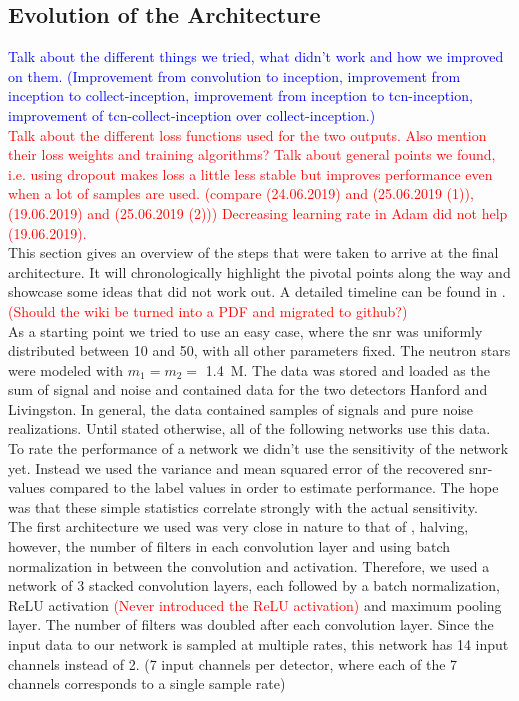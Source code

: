 \subsection{Evolution of the Architecture}\label{sec:evolution_of_architecture}
\textcolor{blue}{Talk about the different things we tried, what didn't work and how we improved on them. (Improvement from convolution to inception, improvement from inception to collect-inception, improvement from inception to tcn-inception, improvement of tcn-collect-inception over collect-inception.)}\\
\textcolor{red}{Talk about the different loss functions used for the two outputs. Also mention their loss weights and training algorithms? Talk about general points we found, i.e. using dropout makes loss a little less stable but improves performance even when a lot of samples are used. (compare (24.06.2019) and (25.06.2019 (1)), (19.06.2019) and (25.06.2019 (2))) Decreasing learning rate in Adam did not help (19.06.2019).}\\
This section gives an overview of the steps that were taken to arrive at the final architecture. It will chronologically highlight the pivotal points along the way and showcase some ideas that did not work out. A detailed timeline can be found in \cite{network_wiki}. \textcolor{red}{(Should the wiki be turned into a PDF and migrated to github?)}\\
As a starting point we tried to use an easy case, where the \gls{snr} was uniformly distributed between 10 and 50, with all other parameters fixed. The neutron stars were modeled with $m_1=m_2=$ \SI{1.4}{M_\odot}. The data was stored and loaded as the sum of signal and noise and contained data for the two detectors Hanford and Livingston. In general, the data contained samples of signals and pure noise realizations. Until stated otherwise, all of the following networks use this data.\\
To rate the performance of a network we didn't use the sensitivity of the network yet. Instead we used the variance and mean squared error of the recovered \gls{snr}-values compared to the label values in order to estimate performance. The hope was that these simple statistics correlate strongly with the actual sensitivity.\medskip\\
The first architecture we used was very close in nature to that of \cite{huerta_parameter_estimation}, halving, however, the number of filters in each convolution layer and using batch normalization in between the convolution and activation. Therefore, we used a network of 3 stacked convolution layers, each followed by a batch normalization, ReLU activation \textcolor{red}{(Never introduced the ReLU activation)} and maximum pooling layer. The number of filters was doubled after each convolution layer. Since the input data to our network is sampled at multiple rates, this network has 14 input channels instead of 2. (7 input channels per detector, where each of the 7 channels corresponds to a single sample rate)\\
